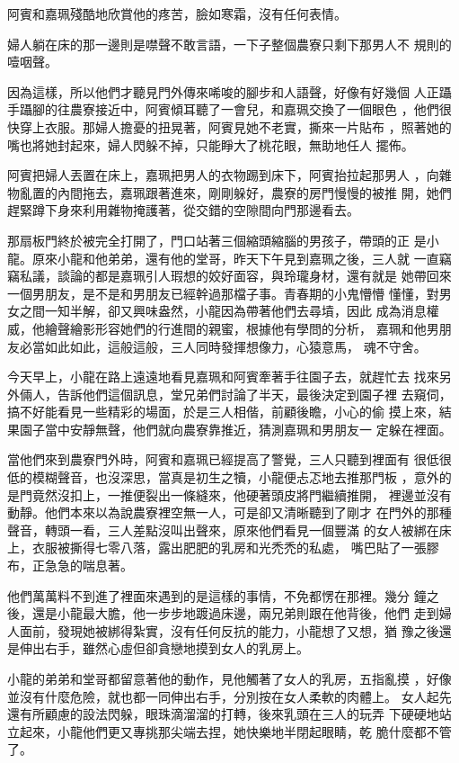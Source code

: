阿賓和嘉珮殘酷地欣賞他的疼苦，臉如寒霜，沒有任何表情。

婦人躺在床的那一邊則是噤聲不敢言語，一下子整個農寮只剩下那男人不
規則的噎咽聲。

因為這樣，所以他們才聽見門外傳來唏唆的腳步和人語聲，好像有好幾個
人正躡手躡腳的往農寮接近中，阿賓傾耳聽了一會兒，和嘉珮交換了一個眼色
，他們很快穿上衣服。那婦人擔憂的扭晃著，阿賓見她不老實，撕來一片貼布
，照著她的嘴也將她封起來，婦人閃躲不掉，只能睜大了桃花眼，無助地任人
擺佈。

阿賓把婦人丟置在床上，嘉珮把男人的衣物踢到床下，阿賓抬拉起那男人
，向雜物亂置的內間拖去，嘉珮跟著進來，剛剛躲好，農寮的房門慢慢的被推
開，她們趕緊蹲下身來利用雜物掩護著，從交錯的空隙間向門那邊看去。

那扇板門終於被完全打開了，門口站著三個縮頭縮腦的男孩子，帶頭的正
是小龍。原來小龍和他弟弟，還有他的堂哥，昨天下午見到嘉珮之後，三人就
一直竊竊私議，談論的都是嘉珮引人瑕想的姣好面容，與玲瓏身材，還有就是
她帶回來一個男朋友，是不是和男朋友已經幹過那檔子事。青春期的小鬼懵懵
懂懂，對男女之間一知半解，卻又興味盎然，小龍因為帶著他們去尋墳，因此
成為消息權威，他繪聲繪影形容她們的行進間的親蜜，根據他有學問的分析，
嘉珮和他男朋友必當如此如此，這般這般，三人同時發揮想像力，心猿意馬，
魂不守舍。

今天早上，小龍在路上遠遠地看見嘉珮和阿賓牽著手往園子去，就趕忙去
找來另外倆人，告訴他們這個訊息，堂兄弟們討論了半天，最後決定到園子裡
去窺伺，搞不好能看見一些精彩的場面，於是三人相偕，前顧後瞻，小心的偷
摸上來，結果園子當中安靜無聲，他們就向農寮靠推近，猜測嘉珮和男朋友一
定躲在裡面。

當他們來到農寮門外時，阿賓和嘉珮已經提高了警覺，三人只聽到裡面有
很低很低的模糊聲音，也沒深思，當真是初生之犢，小龍便忐忑地去推那門板
，意外的是門竟然沒扣上，一推便裂出一條縫來，他硬著頭皮將門繼續推開，
裡邊並沒有動靜。他們本來以為說農寮裡空無一人，可是卻又清晰聽到了剛才
在門外的那種聲音，轉頭一看，三人差點沒叫出聲來，原來他們看見一個豐滿
的女人被綁在床上，衣服被撕得七零八落，露出肥肥的乳房和光禿禿的私處，
嘴巴貼了一張膠布，正急急的喘息著。

他們萬萬料不到進了裡面來遇到的是這樣的事情，不免都愣在那裡。幾分
鐘之後，還是小龍最大膽，他一步步地踱過床邊，兩兄弟則跟在他背後，他們
走到婦人面前，發現她被綁得紮實，沒有任何反抗的能力，小龍想了又想，猶
豫之後還是伸出右手，雖然心虛但卻貪戀地摸到女人的乳房上。

小龍的弟弟和堂哥都留意著他的動作，見他觸著了女人的乳房，五指亂摸
，好像並沒有什麼危險，就也都一同伸出右手，分別按在女人柔軟的肉體上。
女人起先還有所顧慮的設法閃躲，眼珠滴溜溜的打轉，後來乳頭在三人的玩弄
下硬硬地站立起來，小龍他們更又專挑那尖端去捏，她快樂地半閉起眼睛，乾
脆什麼都不管了。

